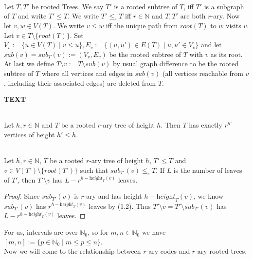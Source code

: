 \documentclass[12pt]{article}
\newcommand{\he}[0]{\textit{height}}
\newcommand{\ro}[0]{\textit{root}}
\newcommand{\SUB}[0]{\textit{sub}}
\newenvironment{statement3}[3]{\begin{trivlist}
\item[\hskip \labelsep {\bfseries #1}\hskip \labelsep {\bfseries #2} {#3}\textbf{.}]}{\end{trivlist}}
\begin{document}
\begin{statement3}{(1.1)}{Definition}{(Subtrees and Ordering)}\strut\\[2pt]
    Let $T, T'$ be rooted Trees. We say $T'$ is a rooted subtree of $T$, iff $T'$ is a subgraph of $T$ and write
    $T' \leq T$. We write $T' \leq_r T$ iff $r \in \mathbb{N}$ and $T,T'$ are both $r$-ary.
    Now let $v,w \in V(T)$. We write $v \leq w$ iff the unique path from $\ro(T)$ to $w$ visits $v$.
    Let $v \in T \setminus \{\ro(T)\}$. Set
    $V_v := \{u \in V(T) \mid v \leq u\}, E_v := \{(u,u') \in E(T) \mid u,u' \in V_v\}$
    and let $\SUB(v) = \SUB_T(v) := (V_v, E_v)$ be the rooted subtree of $T$ with $v$ as its root.
    At last we define $T \setminus v := T \setminus \SUB(v)$ by usual graph difference to be the rooted subtree of $T$
    where all vertices and edges in $\SUB(v)$ (all vertices reachable from $v$, 
    including their associated edges) are deleted from $T$.
\end{statement3}

\newpage

\textbf{TEXT}

\begin{statement3}{(1.2)}{Remark}{(Number of vertices of some height in rooted r-ary Trees)}\strut\\[2pt]
    Let $h,r \in \mathbb{N}$ and $T$ be a rooted $r$-ary tree of height $h$.
    Then $T$ has exactly $r^{h'}$ vertices of height $h' \leq h$.
\end{statement3}

\begin{statement3}{(1.3)}{Corollary}{(Number of Leaves of $T \setminus v$)}\strut\\[2pt]
    Let $h,r \in \mathbb{N}$, $T$ be a rooted $r$-ary tree of height $h$, $T' \leq T$ and
    $v \in V(T') \setminus \{\ro(T')\}$ such that $\SUB_{T'}(v) \leq_r T$.
    If $L$ is the number of leaves of $T'$, then $T' \setminus v$ has $L - r^{h - \he_T(v)}$ leaves.

    \begin{proof}
        Since $\SUB_{T'}(v)$ is $r$-ary and has height $h - \he_T(v)$, we know $\SUB_{T'}(v)$ has
        $r^{h- \he_T(v)}$ leaves by (1.2).
        Thus $T' \setminus v = T' \setminus \SUB_{T'}(v)$ has $L - r^{h-\he_T(v)}$ leaves.
    \end{proof}
\end{statement3}

For us, intervals are over $\mathbb{N}_0$, so for $m,n \in \mathbb{N}_0$ we have $[m,n] := \{p \in \mathbb{N}_0 \mid
m \leq p \leq n\}$.\\
Now we will come to the relationship between $r$-ary codes and $r$-ary rooted trees.
\end{document}
